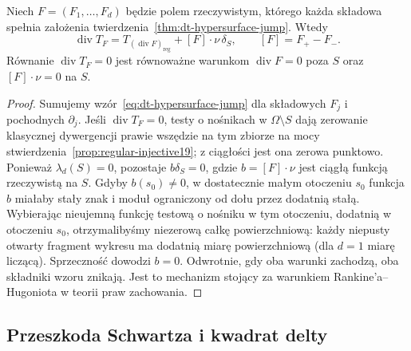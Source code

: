 \begin{wniosek}
Niech $F=(F_1,\ldots,F_d)$ będzie polem rzeczywistym,
którego każda składowa spełnia założenia
twierdzenia~\ref{thm:dt-hypersurface-jump}. Wtedy
\[
 \operatorname{div}T_F
 =T_{(\operatorname{div}F)_{\mathrm{reg}}}
 +[F]\cdot\nu\,\delta_S,\qquad [F]=F_+-F_-.
\]
Równanie $\operatorname{div}T_F=0$ jest równoważne
warunkom $\operatorname{div}F=0$ poza $S$ oraz
$[F]\cdot\nu=0$ na $S$.
\end{wniosek}
\begin{proof}
Sumujemy wzór~\eqref{eq:dt-hypersurface-jump} dla składowych
$F_j$ i pochodnych $\partial_j$.
Jeśli $\operatorname{div}T_F=0$, testy o nośnikach
w $\Omega\setminus S$ dają zerowanie klasycznej
dywergencji prawie wszędzie na tym zbiorze na mocy
stwierdzenia~\ref{prop:regular-injective19}; z ciągłości
jest ona zerowa punktowo. Ponieważ $\lambda_d(S)=0$,
pozostaje $b\delta_S=0$, gdzie $b=[F]\cdot\nu$ jest
ciągłą funkcją rzeczywistą na $S$.
Gdyby $b(s_0)\ne0$, w dostatecznie małym otoczeniu
$s_0$ funkcja $b$ miałaby stały znak i moduł
ograniczony od dołu przez dodatnią stałą.
Wybierając nieujemną funkcję testową o nośniku
w tym otoczeniu, dodatnią w otoczeniu $s_0$,
otrzymalibyśmy niezerową całkę powierzchniową:
każdy niepusty otwarty fragment wykresu ma dodatnią
miarę powierzchniową (dla $d=1$ miarę liczącą).
Sprzeczność dowodzi $b=0$. Odwrotnie, gdy oba
warunki zachodzą, oba składniki wzoru znikają.
Jest to mechanizm stojący za warunkiem
Rankine'a--Hugoniota w teorii praw zachowania.
\end{proof}

\subsection{Przeszkoda Schwartza i kwadrat delty}

